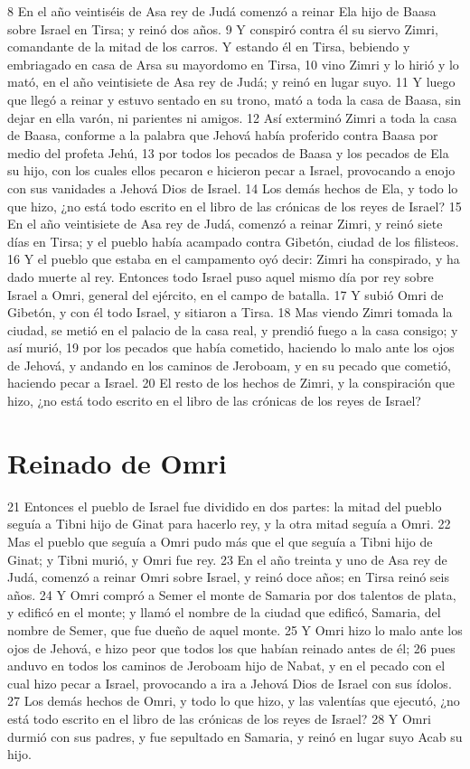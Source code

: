 8 En el año veintiséis de Asa rey de Judá comenzó a reinar Ela hijo de Baasa sobre Israel en Tirsa; y reinó dos años.
9 Y conspiró contra él su siervo Zimri, comandante de la mitad de los carros. Y estando él en Tirsa, bebiendo y embriagado en casa de Arsa su mayordomo en Tirsa,
10 vino Zimri y lo hirió y lo mató, en el año veintisiete de Asa rey de Judá; y reinó en lugar suyo.
11 Y luego que llegó a reinar y estuvo sentado en su trono, mató a toda la casa de Baasa, sin dejar en ella varón, ni parientes ni amigos.
12 Así exterminó Zimri a toda la casa de Baasa, conforme a la palabra que Jehová había proferido contra Baasa por medio del profeta Jehú,
13 por todos los pecados de Baasa y los pecados de Ela su hijo, con los cuales ellos pecaron e hicieron pecar a Israel, provocando a enojo con sus vanidades a Jehová Dios de Israel.
14 Los demás hechos de Ela, y todo lo que hizo, ¿no está todo escrito en el libro de las crónicas de los reyes de Israel?
15 En el año veintisiete de Asa rey de Judá, comenzó a reinar Zimri, y reinó siete días en Tirsa; y el pueblo había acampado contra Gibetón, ciudad de los filisteos.
16 Y el pueblo que estaba en el campamento oyó decir: Zimri ha conspirado, y ha dado muerte al rey. Entonces todo Israel puso aquel mismo día por rey sobre Israel a Omri, general del ejército, en el campo de batalla.
17 Y subió Omri de Gibetón, y con él todo Israel, y sitiaron a Tirsa.
18 Mas viendo Zimri tomada la ciudad, se metió en el palacio de la casa real, y prendió fuego a la casa consigo; y así murió,
19 por los pecados que había cometido, haciendo lo malo ante los ojos de Jehová, y andando en los caminos de Jeroboam, y en su pecado que cometió, haciendo pecar a Israel.
20 El resto de los hechos de Zimri, y la conspiración que hizo, ¿no está todo escrito en el libro de las crónicas de los reyes de Israel?
\section*{Reinado de Omri}

21 Entonces el pueblo de Israel fue dividido en dos partes: la mitad del pueblo seguía a Tibni hijo de Ginat para hacerlo rey, y la otra mitad seguía a Omri.
22 Mas el pueblo que seguía a Omri pudo más que el que seguía a Tibni hijo de Ginat; y Tibni murió, y Omri fue rey.
23 En el año treinta y uno de Asa rey de Judá, comenzó a reinar Omri sobre Israel, y reinó doce años; en Tirsa reinó seis años.
24 Y Omri compró a Semer el monte de Samaria por dos talentos de plata,  y edificó en el monte; y llamó el nombre de la ciudad que edificó, Samaria, del nombre de Semer, que fue dueño de aquel monte.
25 Y Omri hizo lo malo ante los ojos de Jehová, e hizo peor que todos los que habían reinado antes de él;
26 pues anduvo en todos los caminos de Jeroboam hijo de Nabat, y en el pecado con el cual hizo pecar a Israel, provocando a ira a Jehová Dios de Israel con sus ídolos.
27 Los demás hechos de Omri, y todo lo que hizo, y las valentías que ejecutó, ¿no está todo escrito en el libro de las crónicas de los reyes de Israel?
28 Y Omri durmió con sus padres, y fue sepultado en Samaria, y reinó en lugar suyo Acab su hijo.
